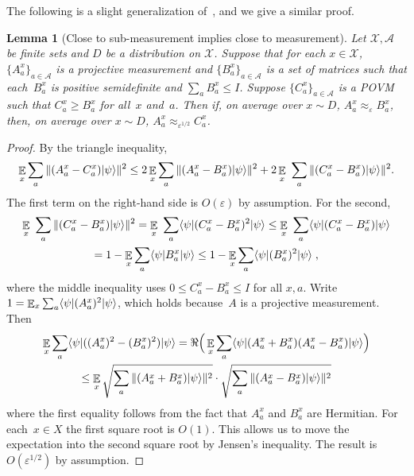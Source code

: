 \documentclass[11pt]{article}
\newtheorem{lemma}[theorem]{Lemma}
\theoremstyle{definition}
\newcommand{\ket}[1]{|#1\rangle}
\newcommand{\bra}[1]{\langle#1|}
\newcommand{\Id}{\ensuremath{I}}
\newcommand{\eps}{\varepsilon}
\newcommand{\E}{\mathop{\mathbb{E}}\displaylimits}
\renewcommand{\cal}[1]{\mathcal{#1}}
\begin{document}
The following is a slight generalization of~\cite[Fact~4.25]{NW19},
and we give a similar proof.

\begin{lemma}[Close to sub-measurement implies close to measurement]
  \label{lem:replace-with-measurement}
  Let $\cal{X},\cal{A}$ be finite sets and $D$ be a distribution on $\cal{X}$.
  Suppose that for each $x\in \cal{X}$, $\{A^x_a\}_{a\in \cal{A}}$ is a
  projective measurement and $\{B^x_a\}_{a\in \cal{A}}$ is a set of matrices
  such that each~$B^x_a$ is positive semidefinite and $\sum_{a}B^x_a \leq \Id$.
  Suppose $\{C^x_a\}_{a \in \cal{A}}$ is a POVM such that $C^x_a \geq B^x_a$ for
  all~$x$ and~$a$.
  Then if, on average over $x\sim D$, $A^x_a \approx_{\eps} B^x_a$, then, on
  average over $x\sim D$, $A^x_a \approx_{\eps^{1/2}} C^x_a$.
\end{lemma}

\begin{proof}
  By the triangle inequality,
  \begin{equation*}
    \E_{x} \sum_a \Vert (A^{x}_a - C^{x}_a) \ket{\psi} \Vert^2
    \leq 2\E_{x} \sum_a \Vert (A^{x}_a - B^{x}_a) \ket{\psi} \Vert^2
    + 2 \E_{x}\ \sum_a \Vert (C^x_a - B^x_a) \ket{\psi}\Vert^2.
\end{equation*}
The first term on the right-hand side is $O(\eps)$ by assumption.
For the second,
\begin{multline*}
  \E_{x}\ \sum_a \Vert (C^x_a - B^x_a) \ket{\psi}\Vert^2
  = \E_{x}\ \sum_a \bra{\psi} (C^x_a - B^x_a)^2 \ket{\psi}
  \leq \E_{x}\ \sum_a \bra{\psi} (C^x_a - B^x_a) \ket{\psi}\\
  = 1- \E_{x} \sum_a\bra{\psi}  B^{x}_a \ket{\psi}
  \leq1- \E_{x} \sum_a\bra{\psi}  (B^{x}_a)^2 \ket{\psi}\;,
\end{multline*}
where the middle inequality uses $0\leq C^x_a-B^x_a\leq \Id$ for all $x,a$. 
Write $1 = \E_{x} \sum_a \bra{\psi} (A^{x}_a)^2 \ket{\psi}$, which holds
because~$A$ is a projective measurement.
Then
\begin{multline*}
  \E_{x} \sum_a \bra{\psi} ((A^{x}_a)^2  - (B^{x}_a)^2)\ket{\psi}
  = \Re\Big(\E_{x} \sum_a \bra{\psi} (A^{x}_a  + B^{x}_a)(A^{x}_a - B^{x}_a)
  \ket{\psi}\Big)\\
  \leq \E_{x} \sqrt{\sum_a \Vert (A^{x}_a + B^{x}_a) \ket{\psi}\Vert^2}
	\cdot \sqrt{\sum_a \Vert (A^{x}_a - B^{x}_a)\ket{\psi} \Vert^2}
\end{multline*}
where the first equality follows from the fact that $A^x_a$ and $B^x_a$ are
Hermitian.
For each~$x\in X$ the first square root is $O(1)$.
This allows us to move the expectation into the second square root by Jensen's
inequality.
The result is $O(\eps^{1/2})$ by assumption. 
\end{proof}
\end{document}

